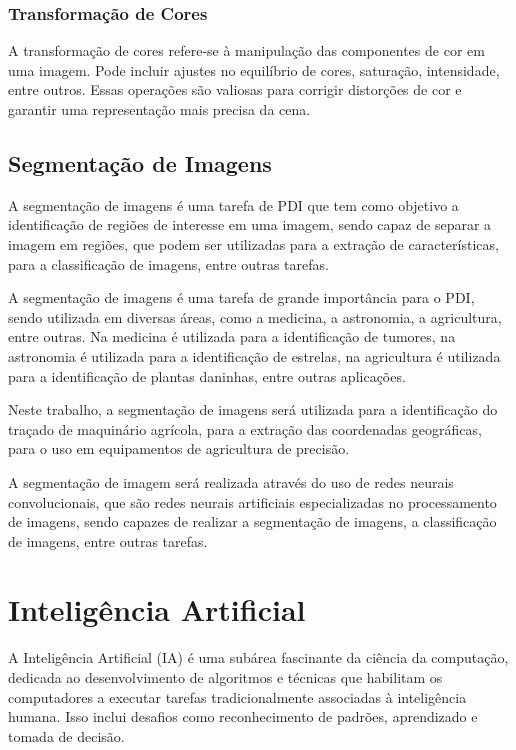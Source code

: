 \documentclass[conference]{IEEEtran}
\begin{document}
\subsubsection{Transformação de Cores}
A transformação de cores refere-se à manipulação das componentes de cor em uma imagem. 
Pode incluir ajustes no equilíbrio de cores, saturação, intensidade, entre outros. 
Essas operações são valiosas para corrigir distorções de cor e garantir uma representação 
mais precisa da cena.

\subsection{Segmentação de Imagens}
A segmentação de imagens é uma tarefa de PDI que tem como objetivo a identificação de regiões de 
interesse em uma imagem, sendo capaz de separar a imagem em regiões, que podem ser utilizadas 
para a extração de características, para a classificação de imagens, entre outras tarefas.

A segmentação de imagens é uma tarefa de grande importância para o PDI, sendo utilizada em diversas áreas, como a medicina,
a astronomia, a agricultura, entre outras. Na medicina é utilizada para a identificação de tumores, na astronomia é utilizada
para a identificação de estrelas, na agricultura é utilizada para a identificação de plantas daninhas, entre outras aplicações.

Neste trabalho, a segmentação de imagens será utilizada para a identificação do traçado de maquinário agrícola, para a
extração das coordenadas geográficas, para o uso em equipamentos de agricultura de precisão.

A segmentação de imagem será realizada através do uso de redes neurais convolucionais, que são redes neurais artificiais
especializadas no processamento de imagens, sendo capazes de realizar a segmentação de imagens, a classificação de imagens,
entre outras tarefas.

\section{Inteligência Artificial}
A Inteligência Artificial (IA) é uma subárea fascinante da ciência da computação,
dedicada ao desenvolvimento de algoritmos e técnicas que habilitam os computadores a
executar tarefas tradicionalmente associadas à inteligência humana.
Isso inclui desafios como reconhecimento de padrões, aprendizado e tomada de decisão.
\cite{lima2014inteligencia}
\end{document}
